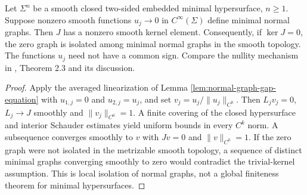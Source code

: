 \begin{proposition}\label{prop:accumulating-graphs-jacobi}
Let $\Sigma^n$ be a smooth closed two-sided embedded minimal hypersurface, $n\geq1$. Suppose nonzero smooth functions $u_j\to0$ in $C^\infty(\Sigma)$ define minimal normal graphs. Then $J$ has a nonzero smooth kernel element. Consequently, if $\ker J=0$, the zero graph is isolated among minimal normal graphs in the smooth topology. The functions $u_j$ need not have a common sign. Compare the nullity mechanism in \cite{Sharp17}, Theorem 2.3 and its discussion.
\end{proposition}
\begin{proof}
Apply the averaged linearization of Lemma \ref{lem:normal-graph-gap-equation} with $u_{1,j}=0$ and $u_{2,j}=u_j$, and set $v_j=u_j/\|u_j\|_{C^0}$. Then $L_jv_j=0$, $L_j\to J$ smoothly and $\|v_j\|_{C^0}=1$. A finite covering of the closed hypersurface and interior Schauder estimates yield uniform bounds in every $C^k$ norm. A subsequence converges smoothly to $v$ with $Jv=0$ and $\|v\|_{C^0}=1$. If the zero graph were not isolated in the metrizable smooth topology, a sequence of distinct minimal graphs converging smoothly to zero would contradict the trivial-kernel assumption. This is local isolation of normal graphs, not a global finiteness theorem for minimal hypersurfaces.
\end{proof}

